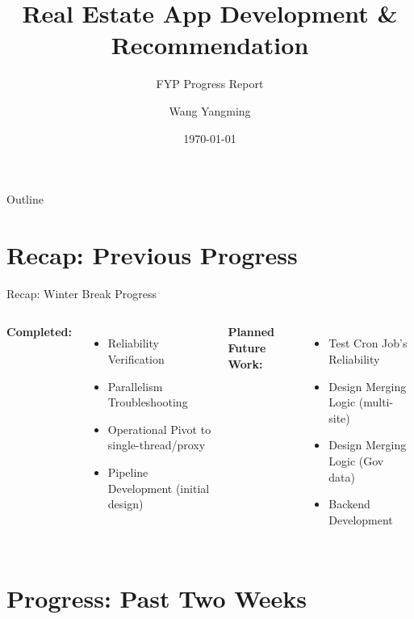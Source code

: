 \documentclass[aspectratio=169,10pt]{beamer}
\title{Real Estate App Development \& Recommendation}
\subtitle{FYP Progress Report}
\author{Wang Yangming}
\institute{Nanyang Technological University}
\date{\today}
\begin{document}
\begin{frame}
    \titlepage
\end{frame}

\begin{frame}{Outline}
    \tableofcontents
\end{frame}

\section{Recap: Previous Progress}

\begin{frame}{Recap: Winter Break Progress}
    \begin{columns}[T]
        \textbf{Completed:}
        \begin{itemize}
            \item Reliability Verification
            \item Parallelism Troubleshooting
            \item Operational Pivot to single-thread/proxy
            \item Pipeline Development (initial design)
        \end{itemize}
        
        \textbf{Planned Future Work:}
        \begin{itemize}
            \item Test Cron Job's Reliability
            \item Design Merging Logic (multi-site)
            \item Design Merging Logic (Gov data)
            \item Backend Development
        \end{itemize}
    \end{columns}
\end{frame}

\section{Progress: Past Two Weeks}
\end{document}
